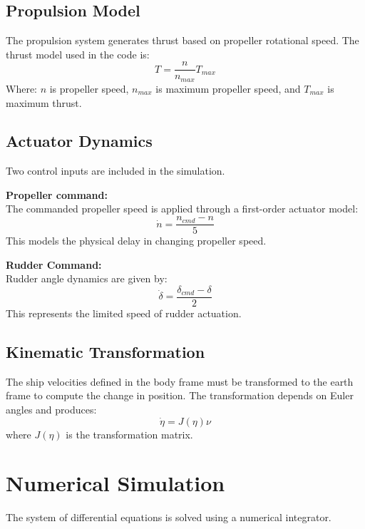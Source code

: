 \documentclass[12pt,a4paper]{report}
\begin{document}
\section{Propulsion Model}
The propulsion system generates thrust based on propeller rotational speed. The thrust model used in the code is:
\begin{equation}
    T = \frac{n}{n_{max}} T_{max}
\end{equation}
Where: $n$ is propeller speed, $n_{max}$ is maximum propeller speed, and $T_{max}$ is maximum thrust.

\section{Actuator Dynamics}
Two control inputs are included in the simulation.

\textbf{Propeller command:} \\
The commanded propeller speed is applied through a first-order actuator model:
\begin{equation}
    \dot{n} = \frac{n_{cmd} - n}{5}
\end{equation}
This models the physical delay in changing propeller speed.

\textbf{Rudder Command:} \\
Rudder angle dynamics are given by:
\begin{equation}
    \dot{\delta} = \frac{\delta_{cmd} - \delta}{2}
\end{equation}
This represents the limited speed of rudder actuation.

\section{Kinematic Transformation}
The ship velocities defined in the body frame must be transformed to the earth frame to compute the change in position. The transformation depends on Euler angles and produces:
\begin{equation}
    \dot{\eta} = J(\eta)\nu
\end{equation}
where $J(\eta)$ is the transformation matrix.

\chapter{Numerical Simulation}

The system of differential equations is solved using a numerical integrator.
\end{document}

